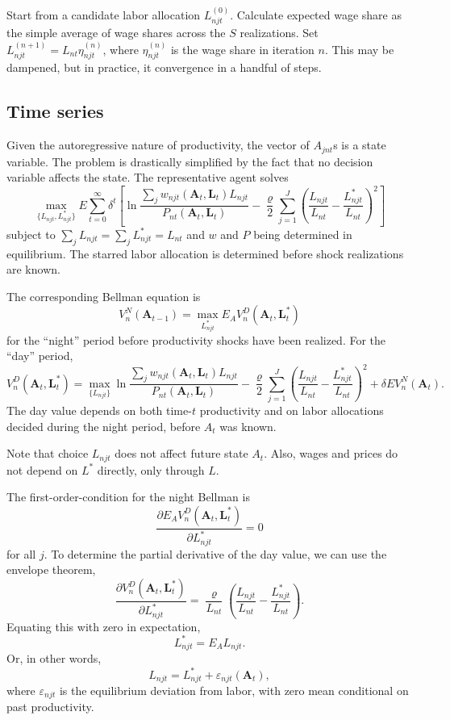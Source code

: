 \documentclass[12pt]{article}
\begin{document}
Start from a candidate labor allocation $L_{njt}^{(0)}$. Calculate expected wage share as the simple average of wage shares across the $S$ realizations. Set $L_{njt}^{(n+1)} = L_{nt}\eta_{njt}^{(n)}$, where $\eta_{njt}^{(n)}$ is the wage share in iteration $n$. This may be dampened, but in practice, it convergence in a handful of steps.

\subsection{Time series}
Given the autoregressive nature of productivity, the vector of $A_{jnt}$s is a state variable. The problem is drastically simplified by the fact that no decision variable affects the state. The representative agent solves
\[
\max_{\{L_{njt}, L_{njt}^*\}}
E
\sum_{t=0}^{\infty} 
	\delta^{t} 
	\left[
	\ln \frac 
		{\sum_j w_{njt}(\mathbf A_{t}, \mathbf L_{t})L_{njt}}
		{P_{nt}(\mathbf A_{t}, \mathbf L_{t})}
	-\frac \varrho 2
		\sum_{j=1}^J
		\left(
			\frac {L_{njt}} {L_{nt}}
			- 
			\frac {L_{njt}^*} {L_{nt}}
		\right)^2
	\right]
\]
subject to $\sum_j L_{njt}=\sum_j L_{njt}^*=L_{nt}$ and $w$ and $P$ being determined in equilibrium. The starred labor allocation is determined before shock realizations are known.

The corresponding Bellman equation is
\begin{equation}
	V_n^N(\mathbf A_{t-1}) = 
	\max_{L_{njt}^*}
	E_{A} V_n^D(\mathbf A_{t}, \mathbf L_{t}^*)
\end{equation}
for the ``night'' period before productivity shocks have been realized. For the ``day'' period,
\begin{equation}
	V_n^D(\mathbf A_{t}, \mathbf L_{t}^*) = 
	\max_{\{L_{njt}\}}
		\ln \frac 
			{\sum_j w_{njt}(\mathbf A_{t}, \mathbf L_{t})L_{njt}}
			{P_{nt}(\mathbf A_{t}, \mathbf L_{t})}
		-\frac \varrho 2
			\sum_{j=1}^J
			\left(
				\frac {L_{njt}} {L_{nt}}
				- 
				\frac {L_{njt}^*} {L_{nt}}
			\right)^2
	+ \delta E V_n^N(\mathbf A_{t}).
\end{equation}
The day value depends on both time-$t$ productivity and on labor allocations decided during the night period, before $A_t$ was known.

Note that choice $L_{njt}$ does not affect future state $A_t$. Also, wages and prices do not depend on $L^*$ directly, only through $L$.

The first-order-condition for the night Bellman is
\[
\frac 
	{\partial E_{A} V_n^D(\mathbf A_{t}, \mathbf L_{t}^*)}
	{\partial L_{njt}^*}
	= 0
\]
for all $j$. To determine the partial derivative of the day value, we can use the envelope theorem,
\[
\frac 
	{\partial V_n^D(\mathbf A_{t}, \mathbf L_{t}^*)}
	{\partial L_{njt}^*}
	= 
	\frac \varrho {L_{nt}}
	\left(
				\frac {L_{njt}} {L_{nt}}
				- 
				\frac {L_{njt}^*} {L_{nt}}
	\right).
\]
Equating this with zero in expectation,
\[
L_{njt}^* = E_{A} L_{njt}.
\]
Or, in other words,
\[
L_{njt} = L_{njt}^* + \varepsilon_{njt}(\mathbf A_t),
\]
where $\varepsilon_{njt}$ is the equilibrium deviation from labor, with zero mean conditional on past productivity.
\end{document}
